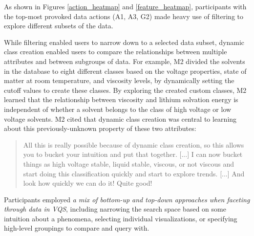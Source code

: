 As shown in Figures \ref{action_heatmap} and \ref{feature_heatmap}, participants with the top-most provoked data actions (A1, A3, G2) made heavy use of filtering to explore different subsets of the data.
\par While filtering enabled users to narrow down to a selected data subset, dynamic class creation enabled users to compare the relationships between multiple attributes and between subgroups of data. For example, M2 divided the solvents in the database to eight different classes based on the voltage properties, state of matter at room temperature, and viscosity levels, by dynamically setting the cutoff values to create these classes. By exploring the created custom classes, M2 learned that the relationship between viscosity and lithium solvation energy is independent of whether a solvent belongs to the class of high voltage or low voltage solvents. M2 cited that dynamic class creation was central to learning about this previously-unknown property of these two attributes:
\begin{quote}
All this is really possible because of dynamic class creation, so this allows you to bucket your intuition and put that together. [...] I can now bucket things as high voltage stable, liquid stable, viscous, or not viscous and start doing this classification quickly and start to explore trends. [...] And look how quickly we can do it! Quite good!
\end{quote}
\par Participants employed \emph{a mix of bottom-up and top-down approaches when faceting through data in VQS}, including narrowing the search space based on some intuition about a phenomena, selecting individual visualizations, or specifying high-level groupings to compare and query with.
